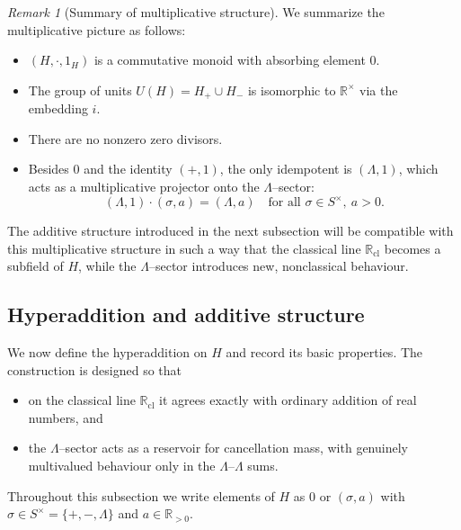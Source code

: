 \documentclass[11pt]{amsart}
\numberwithin{equation}{section}
\theoremstyle{definition}
\theoremstyle{remark}
\newtheorem{remark}[theorem]{Remark}
\newcommand{\R}{\mathbb{R}}
\newcommand{\Rp}{\mathbb{R}_{>0}}
\newcommand{\Rc}{\mathbb{R}_{\mathrm{cl}}} %
\newcommand{\Hnum}{H}                      %
\newcommand{\Snon}{S^{\times}}             %
\newcommand{\iemb}{i}                      %
\newcommand{\idH}{1_H}
\begin{document}
\begin{remark}[Summary of multiplicative structure]\label{rem:H-mult-summary}
We summarize the multiplicative picture as follows:
\begin{itemize}[leftmargin=2em]
  \item $(\Hnum,\cdot,\idH)$ is a commutative monoid with absorbing
        element $0$.
  \item The group of units $U(\Hnum)=H_+\cup H_-$ is isomorphic to
        $\R^\times$ via the embedding $\iemb$.
  \item There are no nonzero zero divisors.
  \item Besides $0$ and the identity $(+,1)$, the only idempotent is
        $(\Lambda,1)$, which acts as a multiplicative projector onto
        the $\Lambda$--sector:
        \[
          (\Lambda,1)\cdot(\sigma,a) = (\Lambda,a)
          \quad\text{for all }\sigma\in\Snon,\ a>0.
        \]
\end{itemize}
The additive structure introduced in the next subsection will be
compatible with this multiplicative structure in such a way that the
classical line $\Rc$ becomes a subfield of $\Hnum$, while the
$\Lambda$--sector introduces new, nonclassical behaviour.
\end{remark}

\subsection{Hyperaddition and additive structure}
\label{subsec:hyperaddition}

We now define the hyperaddition on $\Hnum$ and record its basic
properties.  The construction is designed so that
\begin{itemize}[leftmargin=2em]
  \item on the classical line $\Rc$ it agrees exactly with ordinary
        addition of real numbers, and
  \item the $\Lambda$--sector acts as a reservoir for cancellation
        mass, with genuinely multivalued behaviour only in the
        $\Lambda$--$\Lambda$ sums.
\end{itemize}

Throughout this subsection we write elements of $\Hnum$ as $0$ or
$(\sigma,a)$ with $\sigma\in\Snon=\{+,-,\Lambda\}$ and $a\in\Rp$.
\end{document}
